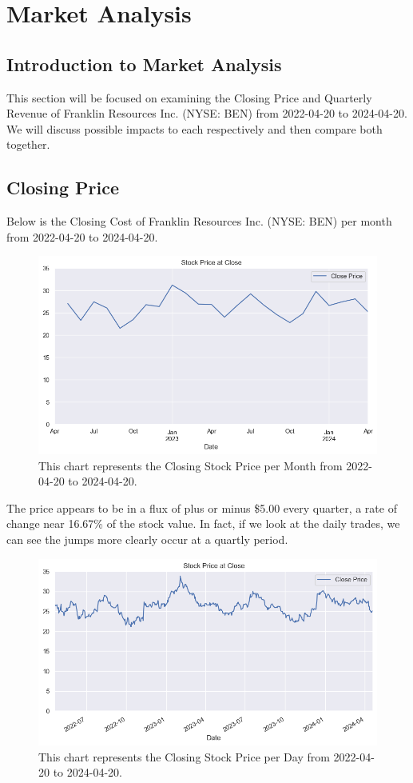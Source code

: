 \documentclass[9pt,a4paper,twoside]{tau}
\begin{document}
\section{Market Analysis}
    \subsection{Introduction to Market Analysis}
        This section will be focused on examining the Closing Price and Quarterly Revenue of Franklin Resources Inc. (NYSE: BEN) from 2022-04-20 to 2024-04-20. We will discuss possible impacts to each respectively and then compare both together.
    
    \subsection{Closing Price}
        Below is the Closing Cost of Franklin Resources Inc. (NYSE: BEN) per month from 2022-04-20 to 2024-04-20.
            \begin{figure}[H]
                \centering
                \includegraphics[width=0.85\columnwidth]{images/CloseDataSet1mo.png}
                \caption{This chart represents the Closing Stock Price per Month from 2022-04-20 to 2024-04-20.}
                \label{fig:figure}
            \end{figure}
        The price appears to be in a flux of plus or minus \$5.00 every quarter, a rate of change near 16.67\% of the stock value. In fact, if we look at the daily trades, we can see the jumps more clearly occur at a quartly period. 
            \begin{figure}[H]
                \centering
                \includegraphics[width=0.85\columnwidth]{images/CloseDataSet1d.png}
                \caption{This chart represents the Closing Stock Price per Day from 2022-04-20 to 2024-04-20.}
                \label{fig:figure}
            \end{figure}
\end{document}
